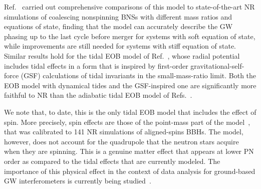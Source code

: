 \documentclass[prd,aps,letter,twocolumn,floatfix,notitlepage]{revtex4-1}
\begin{document}
Ref.~\cite{Dietrich:2017feu} carried out comprehensive comparisons of this model to state-of-the-art NR simulations of coalescing nonspinning BNSs with different mass ratios and equations of state, finding that the model can accurately describe the GW phasing up to the last cycle before merger for systems with soft equation of state, while improvements are still needed for systems with stiff equation of state. Similar results hold for the tidal EOB model of Ref.~\cite{Bernuzzi:2014owa}, whose radial potential includes tidal effects in a form that is inspired by first-order gravitational-self-force (GSF) calculations of tidal invariants in the small-mass-ratio limit. Both the EOB model with dynamical tides and the GSF-inspired one are significantly more faithful to NR than the adiabatic tidal EOB model of Refs.~\cite{Damour:2009wj,Bini:2012gu}.

We note that, to date, this is the only tidal EOB model that includes the effect of spin. More precisely, spin effects are those of the point-mass part of the model~\cite{Bohe:2016gbl}, that was calibrated to 141 NR simulations of aligned-spins BBHs. The model, however, does not account for the quadrupole that the neutron stars acquire when they are spinning. This is a genuine matter effect that appears at lower PN order as compared to the tidal effects that are currently modeled. The importance of this physical effect in the context of data analysis for ground-based GW interferometers is currently being studied~\cite{IanTanja}.
\end{document}
